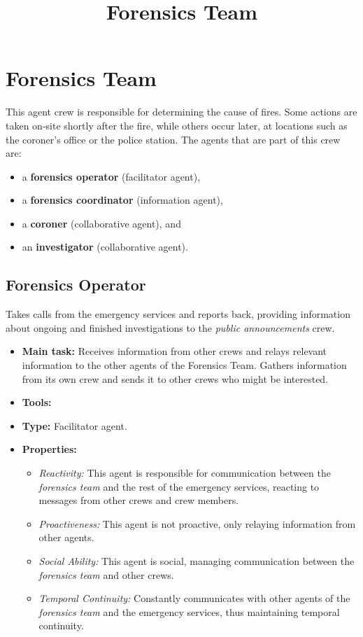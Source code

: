\documentclass{article}
\title{Forensics Team}
\date{}
\begin{document}
\maketitle

\section*{Forensics Team}
This agent crew is responsible for determining the cause of fires. Some actions are taken on-site shortly after the fire, while others occur later, at locations such as the coroner's office or the police station. The agents that are part of this crew are:
\begin{itemize}
    \item a \textbf{forensics operator} (facilitator agent),
    \item a \textbf{forensics coordinator} (information agent),
    \item a \textbf{coroner} (collaborative agent), and
    \item an \textbf{investigator} (collaborative agent).
\end{itemize}

\subsection*{Forensics Operator}
Takes calls from the emergency services and reports back, providing information about ongoing and finished investigations to the \textit{public announcements} crew.
\begin{itemize}
    \item \textbf{Main task:} Receives information from other crews and relays relevant information to the other agents of the Forensics Team. Gathers information from its own crew and sends it to other crews who might be interested.
    \item \textbf{Tools:}
    \item \textbf{Type:} Facilitator agent.
    \item \textbf{Properties:}
    \begin{itemize}
        \item \textit{Reactivity:} This agent is responsible for communication between the \textit{forensics team} and the rest of the emergency services, reacting to messages from other crews and crew members.
        \item \textit{Proactiveness:} This agent is not proactive, only relaying information from other agents.
        \item \textit{Social Ability:} This agent is social, managing communication between the \textit{forensics team} and other crews.
        \item \textit{Temporal Continuity:} Constantly communicates with other agents of the \textit{forensics team} and the emergency services, thus maintaining temporal continuity.
    \end{itemize}
\end{itemize}
\end{document}

